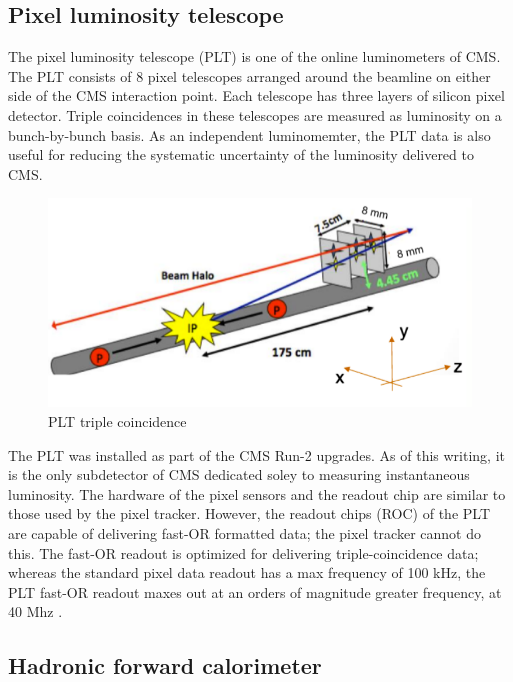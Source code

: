 \subsection{Pixel luminosity telescope}

The pixel luminosity telescope (PLT) is one of the online luminometers of CMS. The PLT consists of 8 pixel telescopes arranged around the beamline on either side of the CMS interaction point. Each telescope has three layers of silicon pixel detector. Triple coincidences in these telescopes are measured as luminosity on a bunch-by-bunch basis. As an independent luminomemter, the PLT data is also useful for reducing the systematic uncertainty of the luminosity delivered to CMS. 

\begin{figure}[]
\begin{centering}
\includegraphics[width=5in]{Chapter4/importfigs/plt_triple.png}
\par\end{centering}
\caption{PLT triple coincidence \label{fig:pltTriple}}
\end{figure}


The PLT was installed as part of the CMS Run-2 upgrades. As of this writing, it is the only subdetector of CMS dedicated soley to measuring instantaneous luminosity. The hardware of the pixel sensors and the readout chip are similar to those used by the pixel tracker. However, the readout chips (ROC) of the PLT are capable of delivering fast-OR formatted data; the pixel tracker cannot do this. The fast-OR readout is optimized for delivering triple-coincidence data; whereas the standard pixel data readout has a max frequency of 100 kHz, the PLT fast-OR readout maxes out at an orders of magnitude greater frequency, at 40 Mhz \cite{Kornmayer:2016wkz}.


\subsection{Hadronic forward calorimeter}

